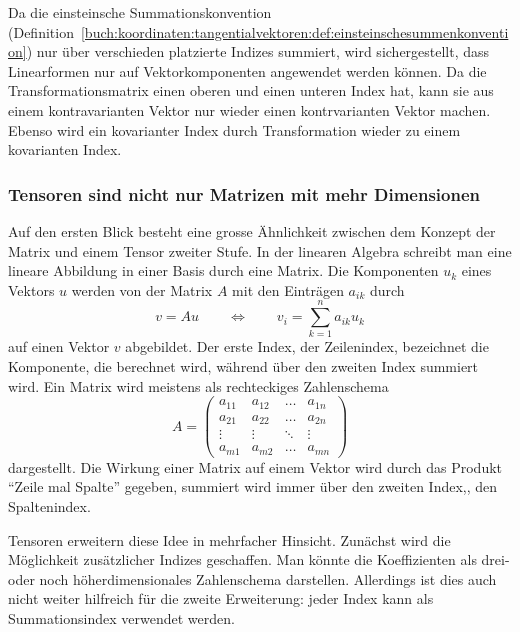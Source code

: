 Da die einsteinsche Summationskonvention
(Definition~\ref{buch:koordinaten:tangentialvektoren:def:einsteinschesummenkonvention})
nur über verschieden platzierte
Indizes summiert, wird sichergestellt, dass Linearformen nur auf
Vektorkomponenten angewendet werden können.
Da die Transformationsmatrix einen oberen und einen unteren Index hat,
kann sie aus einem kontravarianten Vektor nur wieder einen kontrvarianten
Vektor machen.
Ebenso wird ein kovarianter Index durch Transformation wieder zu einem
kovarianten Index.

%
%
\subsubsection{Tensoren sind nicht nur Matrizen mit mehr Dimensionen}
Auf den ersten Blick besteht eine grosse Ähnlichkeit zwischen dem
Konzept der Matrix und einem Tensor zweiter Stufe.
In der linearen Algebra schreibt man eine lineare Abbildung in einer
Basis durch eine Matrix.
Die Komponenten $u_k$ eines Vektors $u$ werden von der Matrix $A$
mit den Einträgen $a_{ik}$ durch
\[
v = Au
\qquad\Leftrightarrow\qquad
v_i = \sum_{k=1}^n a_{ik}u_k
\]
auf einen Vektor $v$ abgebildet.
Der erste Index, der Zeilenindex, bezeichnet die Komponente, die berechnet
wird, während über den zweiten Index summiert wird.
Ein Matrix wird meistens als rechteckiges Zahlenschema
\[
A
=
\begin{pmatrix}
a_{11} & a_{12} & \dots  & a_{1n} \\
a_{21} & a_{22} & \dots  & a_{2n} \\[-2pt]
\vdots & \vdots & \ddots & \vdots \\[-1pt]
a_{m1} & a_{m2} & \dots  & a_{mn}
\end{pmatrix}
\]
dargestellt.
Die Wirkung einer Matrix auf einem Vektor wird durch das Produkt
``Zeile mal Spalte'' gegeben, summiert wird immer über den zweiten
Index,, den Spaltenindex.

Tensoren erweitern diese Idee in mehrfacher Hinsicht.
Zunächst wird die Möglichkeit zusätzlicher Indizes geschaffen.
Man könnte die Koeffizienten als drei- oder noch höherdimensionales
Zahlenschema darstellen.
Allerdings ist dies auch nicht weiter hilfreich für die zweite
Erweiterung: jeder Index kann als Summationsindex verwendet werden.

